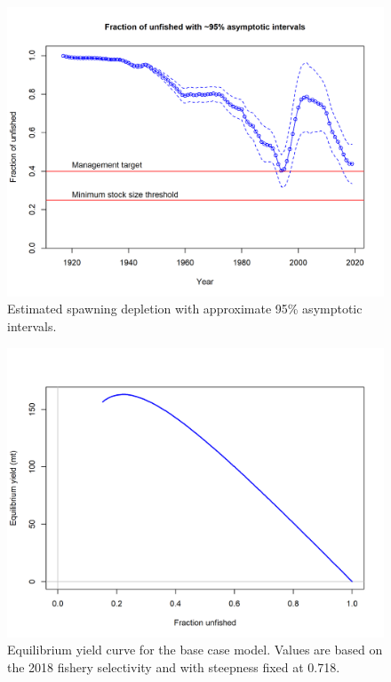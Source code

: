 \documentclass[12pt,]{article}
\begin{document}
\begin{figure}
\centering
\includegraphics{r4ss/plots_mod1/ts9_Fraction_of_unfished_with_95_asymptotic_intervals_intervals.png}
\caption{Estimated spawning depletion with approximate 95\% asymptotic
intervals.
\label{fig:ts9_unfished_with_95_asymptotic_intervals_intervals}}
\end{figure}

\begin{figure}
\centering
\includegraphics{r4ss/plots_mod1/yield1_yield_curve.png}
\caption{Equilibrium yield curve for the base case model. Values are
based on the 2018 fishery selectivity and with steepness fixed at 0.718.
\label{fig:yield1_yield_curve}}
\end{figure}
\end{document}
